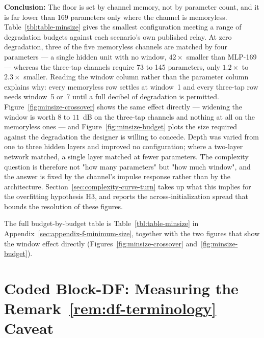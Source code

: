 \textbf{Conclusion:} The floor is set by channel memory, not by parameter count, and it is far lower than 169 parameters only where the channel is memoryless. Table~\ref{tbl:table-minsize} gives the smallest configuration meeting a range of degradation budgets against each scenario's own published relay. At zero degradation, three of the five memoryless channels are matched by four parameters --- a single hidden unit with no window, $42\times$ smaller than MLP-169 --- whereas the three-tap channels require 73 to 145 parameters, only $1.2\times$ to $2.3\times$ smaller. Reading the window column rather than the parameter column explains why: every memoryless row settles at window~1 and every three-tap row needs window~5 or~7 until a full decibel of degradation is permitted. Figure~\ref{fig:minsize-crossover} shows the same effect directly --- widening the window is worth $8$ to $11$~dB on the three-tap channels and nothing at all on the memoryless ones --- and Figure~\ref{fig:minsize-budget} plots the size required against the degradation the designer is willing to concede. Depth was varied from one to three hidden layers and improved no configuration; where a two-layer network matched, a single layer matched at fewer parameters. The complexity question is therefore not "how many parameters" but "how much window", and the answer is fixed by the channel's impulse response rather than by the architecture. Section~\ref{sec:complexity-curve-turn} takes up what this implies for the overfitting hypothesis H3, and reports the across-initialization spread that bounds the resolution of these figures.

The full budget-by-budget table is Table~\ref{tbl:table-minsize} in Appendix~\ref{sec:appendix-f-minimum-size}, together with the two figures that show the window effect directly (Figures~\ref{fig:minsize-crossover} and~\ref{fig:minsize-budget}).

\section{Coded Block-DF: Measuring the Remark~\ref{rem:df-terminology} Caveat}\label{sec:coded-block-df}

